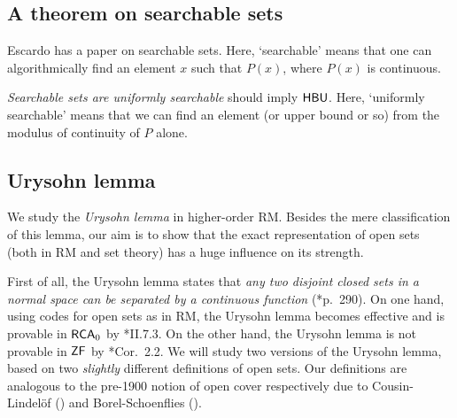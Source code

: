 \documentclass[reqno]{amsart}
\def\ZF{\textup{\textsf{ZF}}}
\def\RCA{\textup{\textsf{RCA}}}
\def\HBU{\textup{\textsf{HBU}}}
\numberwithin{equation}{section}
\numberwithin{thm}{section}
\begin{document}
\subsection{A theorem on searchable sets}
Escardo has a paper on searchable sets.  Here, `searchable' means that one can algorithmically find an element $x$ such that $P(x)$, where $P(x)$ is continuous.  

\smallskip

\emph{Searchable sets are uniformly searchable} should imply $\HBU$.  Here, `uniformly searchable' means that we can find an element (or upper bound or so) from the modulus of continuity of $P$ alone.  




\subsection{Urysohn lemma}
We study the \emph{Urysohn lemma} in higher-order RM.   Besides the mere classification of this lemma, 
our aim is to show that the exact representation of open sets (both in RM and set theory) has a huge influence on its strength.    

\medskip

First of all, the {Urysohn lemma} states that \emph{any two disjoint closed sets in a normal space can be separated by a continuous function} (\cite{uryne}*{p.\ 290}).  
On one hand, using codes for open sets as in RM, the Urysohn lemma becomes effective and is provable in $\RCA_{0}$ by \cite{simpson2}*{II.7.3}.  On the other hand, the Urysohn lemma is not provable in $\ZF$ by \cite{good}*{Cor.\ 2.2}.  
We will study two versions of the Urysohn lemma, based on two \emph{slightly} different definitions of open sets.  Our definitions are analogous to the pre-1900 notion of open cover respectively due to Cousin-Lindel\"of (\cite{cousin1, blindeloef}) and Borel-Schoenflies (\cite{schoen2,opborrelen}).   

\medskip
\end{document}
